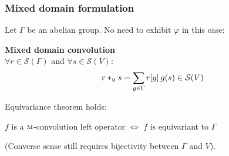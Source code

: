 \documentclass[t,9pt,pdftex]{beamer}
\theoremstyle{definition}
\newcommand{\cs}{\mathcal{S}}
\DeclareMathOperator{\M}{\textsc{m}}
\newcommand{\gve}{G = \langle V, E \rangle}
\newcommand{\h}[1]{\hspace{#1pt}}
\begin{document}
\begin{frame}[c, label=current]
  \frametitle{Mixed domain formulation}
  Let $\Gamma$ be an abelian group. No need to exhibit $\varphi$ in this case:
  \begin{definition}\textbf{Mixed domain convolution}\\
  $\forall r \in \cs(\Gamma)$ and $\forall s \in \cs(V)$:
  \begin{gather*}
  r \ast_{\M} s = \displaystyle \sum_{g \in \Gamma} r[g] \h{2} g(s) \in \cs(V)
  \end{gather*}
  \label{def:convm}
  \end{definition}
  Equivariance theorem holds:
  \begin{corollary}$f$ is a $\M$-convolution left operator $\Leftrightarrow$ $f$ is equivariant to $\Gamma$
  \end{corollary}
  (Converse sense still requires bijectivity between $\Gamma$ and $V$).
\end{frame}

\end{document}
